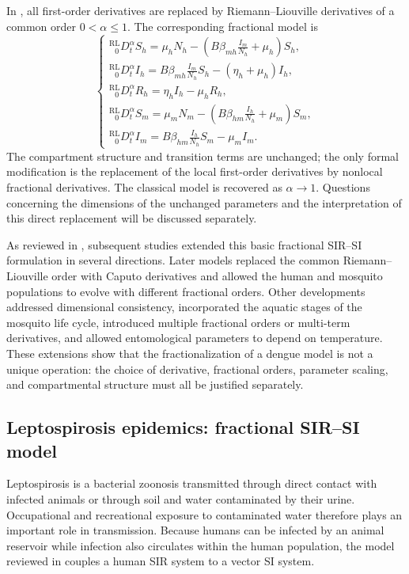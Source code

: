 \documentclass[00-main.tex]{subfiles}
\begin{document}
In \cite{PRT11}, all first-order derivatives are replaced by Riemann--Liouville derivatives of a common order $0<\alpha\leq1$. The corresponding fractional model is
\[
\begin{cases}
    \displaystyle
    {}_{\phantom{R}0}^{\mathrm{RL}}\!D_t^\alpha S_h
    =\mu_hN_h-
      \left(B\beta_{mh}\frac{I_m}{N_h}+\mu_h\right)S_h, \\[3pt]
    \displaystyle
    {}_{\phantom{R}0}^{\mathrm{RL}}\!D_t^\alpha I_h
    =B\beta_{mh}\frac{I_m}{N_h}S_h-(\eta_h+\mu_h)I_h, \\[3pt]
    \displaystyle
    {}_{\phantom{R}0}^{\mathrm{RL}}\!D_t^\alpha R_h
    =\eta_hI_h-\mu_hR_h, \\[3pt]
    \displaystyle
    {}_{\phantom{R}0}^{\mathrm{RL}}\!D_t^\alpha S_m
    =\mu_mN_m-
      \left(B\beta_{hm}\frac{I_h}{N_h}+\mu_m\right)S_m, \\[3pt]
    \displaystyle
    {}_{\phantom{R}0}^{\mathrm{RL}}\!D_t^\alpha I_m
    =B\beta_{hm}\frac{I_h}{N_h}S_m-\mu_mI_m.
\end{cases}
\]
The compartment structure and transition terms are unchanged; the only formal modification is the replacement of the local first-order derivatives by nonlocal fractional derivatives. The classical model is recovered as $\alpha\to1$.
Questions concerning the dimensions of the unchanged parameters and the interpretation of this direct replacement will be discussed separately.

As reviewed in \cite{Ch21}, subsequent studies extended this basic fractional SIR--SI formulation in several directions.
Later models replaced the common Riemann--Liouville order with Caputo derivatives and allowed the human and mosquito populations to evolve with different fractional orders.
Other developments addressed dimensional consistency, incorporated the aquatic stages of the mosquito life cycle, introduced multiple fractional orders or multi-term derivatives, and allowed entomological parameters to depend on temperature.
These extensions show that the fractionalization of a dengue model is not a unique operation: the choice of derivative, fractional orders, parameter scaling, and compartmental structure must all be justified separately.


\subsection{Leptospirosis epidemics: fractional SIR--SI model}

Leptospirosis is a bacterial zoonosis transmitted through direct contact with infected animals or through soil and water contaminated by their urine.
Occupational and recreational exposure to contaminated water therefore plays an important role in transmission.
Because humans can be infected by an animal reservoir while infection also circulates within the human population, the model reviewed in \cite{Ch21} couples a human SIR system to a vector SI system.
\end{document}
